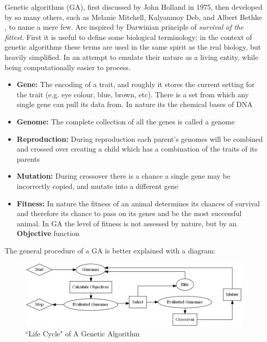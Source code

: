 \documentclass[11pt]{article}
\begin{document}
    Genetic algorithms (GA), first 
    discussed by John Holland \cite{Holland} in 1975, then developed by so many
    others, such as Melanie Mitchell, Kalyanmoy Deb, and Albert Bethke
    \cite{Mitchell, KalyanmoyDeb, Bethke, Goldberg, Grefenstette}, to name a mere few.
    Are inspired by Darwinian
    principle of \textit{survival of the fittest}.
    First it is useful to define some biological terminology; in the context of
    genetic algorithms these terms are used in the same spirit as the real biology,
    but heavily simplified. In an attempt to emulate their nature as a living entity,
    while being computationally easier to process.

    \begin{itemize}
        \item{\textbf{Gene:} The encoding of a trait, and roughly it stores the current
            setting for the trait (e.g. eye colour, blue, brown, etc). There is a set
            from which any single gene can pull its data from. In nature its the chemical
            bases  of DNA}
        \item{\textbf{Genome:} The complete collection of all the genes is called a
            genome}
        \item{\textbf{Reproduction:} During reproduction each parent's genomes will be
            combined and crossed over creating a child which has a combination of
            the traits of its parents}
        \item{\textbf{Mutation:} During crossover there is a chance a single gene
            may be incorrectly copied, and mutate into a different gene}
        \item{\textbf{Fitness: } In nature the fitness of an animal determines
            its chances of survival and therefore its chance to pass on its genes
            and be the most successful animal. In GA the level of fitness is not assessed
            by nature, but by an \textbf{Objective} function}
    \end{itemize}

    The general procedure of a GA is better explained with a diagram:

    \begin{figure}[H] %
        \centering
        \includegraphics[width=\textwidth]{GA}
        \caption{``Life Cycle" of A Genetic Algorithm}\label{fig:GA}
    \end{figure}
\end{document}
